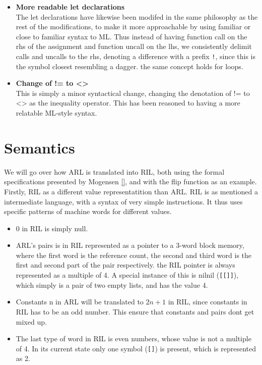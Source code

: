 \documentclass[a4paper]{article}
\begin{document}
\begin{itemize}
\item \textbf{More readable let declarations}\\
The let declarations have likewise been modifed in the same philosophy as the rest of the modifications, to make it more approachable by using familiar or close to familiar syntax to ML. Thus instead of having function call on the rhs of the assignment and function uncall on the lhs, we consistently delimit calls and uncalls to the rhs, denoting a difference with a prefix \texttt{!}, since this is the symbol closest resembling a dagger. the same concept holds for loops.
\item \textbf{Change of != to <>}\\
This is simply a minor syntactical change, changing the denotation of != to <> as the inequality operator. This has been reasoned to having a more relatable ML-style syntax.
\end{itemize}

\section{Semantics}
\label{sec:org3996f41}
We will go over how ARL is translated into RIL, both using the formal specifications presented by Mogensen \ref{}, and with the flip function as an example.
Firstly, RIL as a different value representatition than ARL. RIL is as mentioned a intermediate language, with a syntax of very simple instructions. It thus uses specific patterns of machine words for different values.
\begin{itemize}
\item 0 in RIL is simply null.
\item ARL's pairs is in RIL represented as a pointer to a 3-word block memory, where the first word is the reference count, the second and third word is the first and second part of the pair respectively. the RIL pointer is always represented as a multiple of 4. A special instance of this is nilnil (\texttt{[[]]}), which simply is a pair of two empty lists, and has the value 4.
\item Constants n in ARL will be translated to \(2n+1\) in RIL, since constants in RIL has to be an odd number. This ensure that constants and pairs dont get mixed up.
\item The last type of word in RIL is even numbers, whose value is not a multiple of 4.
In its current state only one symbol (\texttt{[]}) is present, which is represented as 2.
\end{itemize}
\end{document}
